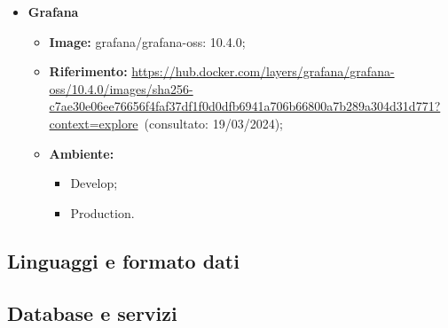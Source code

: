 \begin{itemize}
  \item \textbf{Grafana} 
    \begin{itemize}
      \item \textbf{Image:} grafana/grafana-oss: 10.4.0;
      \item \textbf{Riferimento:} \url{https://hub.docker.com/layers/grafana/grafana-oss/10.4.0/images/sha256-c7ae30e06ee76656f4faf37df1f0d0dfb6941a706b66800a7b289a304d31d771?context=explore}~(consultato: 19/03/2024);
      \item \textbf{Ambiente:}
        \begin{itemize}
          \item Develop;
          \item Production.
        \end{itemize}
    \end{itemize}
\end{itemize}

\subsection{Linguaggi e formato dati}





\subsection{Database e servizi}







